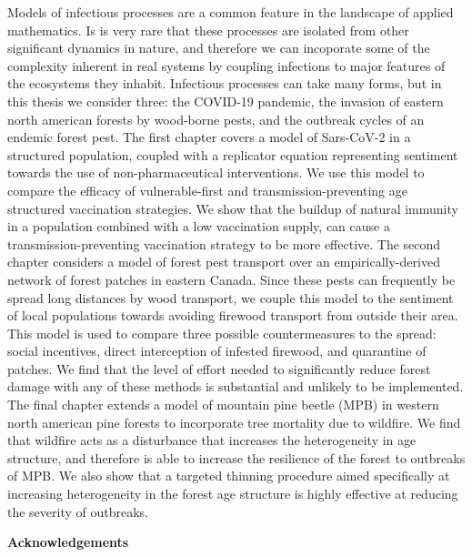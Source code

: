 Models of infectious processes are a common feature in the landscape of applied mathematics. Is is very rare that these processes are isolated from other significant dynamics in nature, and therefore we can incoporate some of the complexity inherent in real systems by coupling infections to major features of the ecosystems they inhabit. Infectious processes can take many forms, but in this thesis we consider three: the COVID-19 pandemic, the invasion of eastern north american forests by wood-borne pests, and the outbreak cycles of an endemic forest pest. The first chapter covers a model of Sars-CoV-2 in a structured population, coupled with a replicator equation representing sentiment towards the use of non-pharmaceutical interventions. We use this model to compare the efficacy of vulnerable-first and transmission-preventing age structured vaccination strategies. We show that the buildup of natural immunity in a population combined with a low vaccination supply, can cause a transmission-preventing vaccination strategy to be more effective. The second chapter considers a model of forest pest transport over an empirically-derived network of forest patches in eastern Canada. Since these pests can frequently be spread long distances by wood transport, we couple this model to the sentiment of local populations towards avoiding firewood transport from outside their area. This model is used to compare three possible countermeasures to the spread: social incentives, direct interception of infested firewood, and quarantine of patches. We find that the level of effort needed to significantly reduce forest damage with any of these methods is substantial and unlikely to be implemented. The final chapter extends a model of mountain pine beetle (MPB) in western north american pine forests to incorporate tree mortality due to wildfire. We find that wildfire acts as a disturbance that increases the heterogeneity in age structure, and therefore is able to increase the resilience of the forest to outbreaks of MPB. We also show that a targeted thinning procedure aimed specifically at increasing heterogeneity in the forest age structure is highly effective at reducing the severity of outbreaks.



\cleardoublepage


\begin{center}\textbf{Acknowledgements}\end{center}



